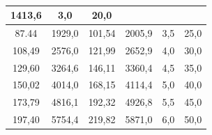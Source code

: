 \documentclass[a4paper,12pt]{article}
\begin{document}
\begin{table}[H]
\begin{tabular}{|cc|cc|cc|}
          {\color[HTML]{000000} 1413,6} &
          \multicolumn{1}{c|}{{\color[HTML]{000000} 3,0}} &
          {\color[HTML]{000000} 20,0} \\ \hline
        \multicolumn{1}{|c|}{{\color[HTML]{000000} 87.44}} &
          {\color[HTML]{000000} 1929,0} &
          \multicolumn{1}{c|}{{\color[HTML]{000000} 101,54}} &
          {\color[HTML]{000000} 2005,9} &
          \multicolumn{1}{c|}{{\color[HTML]{000000} 3,5}} &
          {\color[HTML]{000000} 25,0} \\ \hline
        \multicolumn{1}{|c|}{{\color[HTML]{000000} 108,49}} &
          {\color[HTML]{000000} 2576,0} &
          \multicolumn{1}{c|}{{\color[HTML]{000000} 121,99}} &
          {\color[HTML]{000000} 2652,9} &
          \multicolumn{1}{c|}{{\color[HTML]{000000} 4,0}} &
          {\color[HTML]{000000} 30,0} \\ \hline
        \multicolumn{1}{|c|}{{\color[HTML]{000000} 129,60}} &
          {\color[HTML]{000000} 3264,6} &
          \multicolumn{1}{c|}{{\color[HTML]{000000} 146,11}} &
          {\color[HTML]{000000} 3360,4} &
          \multicolumn{1}{c|}{{\color[HTML]{000000} 4,5}} &
          {\color[HTML]{000000} 35,0} \\ \hline
        \multicolumn{1}{|c|}{{\color[HTML]{000000} 150,02}} &
          {\color[HTML]{000000} 4014,0} &
          \multicolumn{1}{c|}{{\color[HTML]{000000} 168,15}} &
          {\color[HTML]{000000} 4114,4} &
          \multicolumn{1}{c|}{{\color[HTML]{000000} 5,0}} &
          {\color[HTML]{000000} 40,0} \\ \hline
        \multicolumn{1}{|c|}{{\color[HTML]{000000} 173,79}} &
          {\color[HTML]{000000} 4816,1} &
          \multicolumn{1}{c|}{{\color[HTML]{000000} 192,32}} &
          {\color[HTML]{000000} 4926,8} &
          \multicolumn{1}{c|}{{\color[HTML]{000000} 5,5}} &
          {\color[HTML]{000000} 45,0} \\ \hline
        \multicolumn{1}{|c|}{{\color[HTML]{000000} 197,40}} &
          {\color[HTML]{000000} 5754,4} &
          \multicolumn{1}{c|}{{\color[HTML]{000000} 219,82}} &
          {\color[HTML]{000000} 5871,0} &
          \multicolumn{1}{c|}{{\color[HTML]{000000} 6,0}} &
          {\color[HTML]{000000} 50,0} \\ \hline
    \end{tabular}
    \caption{}
\end{table}
\end{document}
